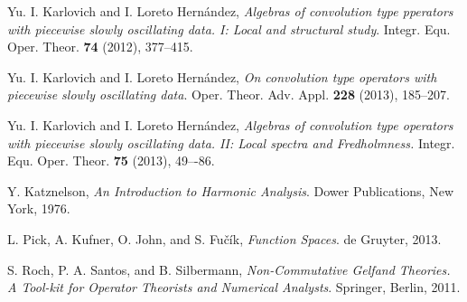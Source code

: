 \documentclass[reqno]{amsproc}
\theoremstyle{definition}
\theoremstyle{remark}
\numberwithin{equation}{section}
\begin{document}
\begin{thebibliography}{99}
Yu. I. Karlovich and I. Loreto Hern\'andez, 
\textit{Algebras of convolution type pperators with piecewise slowly oscillating 
data. I: Local and structural study}.
Integr. Equ. Oper. Theor. \textbf{74} (2012), 377--415.

Yu. I. Karlovich and I. Loreto Hern\'andez, 
\textit{On convolution type operators with piecewise slowly oscillating data}.
Oper. Theor. Adv. Appl. \textbf{228} (2013), 185--207.

Yu. I. Karlovich and I. Loreto Hern\'andez,
\textit{Algebras of convolution type operators with piecewise slowly 
oscillating data. II: Local spectra and Fredholmness.}
Integr. Equ. Oper. Theor. \textbf{75} (2013), 49–-86.

Y. Katznelson, 
\textit{An Introduction to Harmonic Analysis}.
Dower Publications, New York, 1976.

L. Pick, A. Kufner, O. John, and S. Fu\v{c}ík,
\textit{Function Spaces}.
de Gruyter, 2013.

S. Roch, P. A. Santos, and B. Silbermann,
\textit{Non-Commutative Gelfand Theories. A Tool-kit for Operator Theorists
and Numerical Analysts}.
Springer, Berlin, 2011.
\end{thebibliography}
\end{document}

